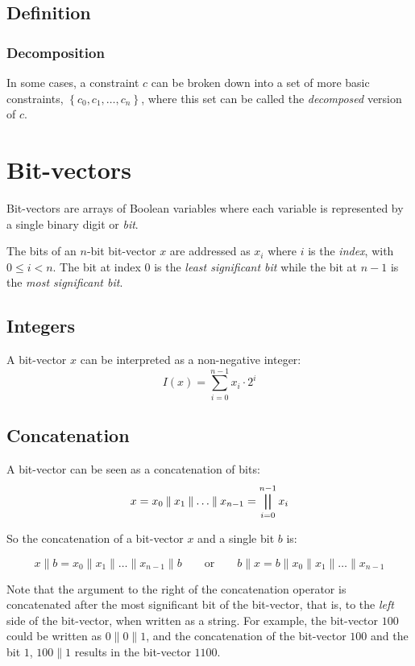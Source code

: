 \documentclass[a4paper,10pt,twoside,openright]{book}
\newcommand{\set}[1]{\left\{#1\right\}}
\newcommand*\concat{\mathbin{\|}}
\begin{document}
\subsection{Definition}

\subsubsection{Decomposition}
In some cases, a constraint $c$ can be broken down into a set of more basic constraints, $\set{c_0,c_1,\ldots,c_n}$,
where this set can be called the \textit{decomposed} version of $c$.

\section{Bit-vectors}
Bit-vectors are arrays of Boolean variables where each variable is represented by a single binary digit or \textit{bit}. 

The bits of an $n$-bit bit-vector $x$ are addressed as $x_i$ where $i$ is the \textit{index}, with $0 \leq i < n$. 
The bit at index $0$ is the \textit{least significant bit} while the bit at $n-1$ is the \textit{most significant bit}.

\subsection{Integers}
A bit-vector $x$ can be interpreted as a non-negative integer: 
\[ I(x) = \sum_{i=0}^{n-1}x_i \cdot 2^i \]

\subsection{Concatenation}
A bit-vector can be seen as a concatenation of bits:
\[x = x_0 \concat x_1 \concat \ldots \concat x_{n-1} = \bigparallel_{i=0}^{n-1} x_i\]

So the concatenation of a bit-vector $x$ and a single bit $b$ is:

\[x \concat b = x_0 \concat x_1 \concat \ldots \concat x_{n-1} \concat b\qquad \text{or}\qquad b \concat x = b \concat x_0 \concat x_1 \concat \ldots \concat x_{n-1}\]

Note that the argument to the right of the concatenation operator is concatenated after the most significant bit of the bit-vector, that is, to the \textit{left} side of the bit-vector, when written as a string. For example, the bit-vector $100$ could be written as $0 \concat 0 \concat 1$, and the concatenation of the bit-vector $100$ and the bit $1$, $100 \concat 1$ results in the bit-vector $1100$.
\end{document}

